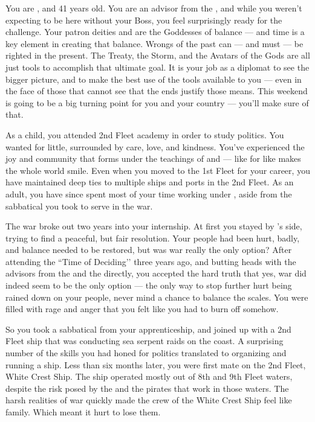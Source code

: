 \documentclass[char]{GL2020}
\begin{document}
\name{\cJuniorStatesman{}}

You are \cJuniorStatesman{\intro}, and 41 years old. You are an advisor from the \pShip{}, and while you weren't expecting to be here without your Boss, you feel surprisingly ready for the challenge. Your patron deities \cEbbFull{\intro} and \cFlowFull{\intro} are the Goddesses of balance — and time is a key element in creating that balance. Wrongs of the past can — and must — be righted in the present. The Treaty, the Storm, and the Avatars of the Gods are all just tools to accomplish that ultimate goal. It is your job as a diplomat to see the bigger picture, and to make the best use of the tools available to you — even in the face of those that cannot see that the ends justify those means. This weekend is going to be a big turning point for you and your country — you'll make sure of that.

As a child, you attended 2nd Fleet academy in order to study politics. You wanted for little, surrounded by care, love, and kindness. You’ve experienced the joy and community that forms under the teachings of \cEbb{\intro} and \cFlow{\intro} — like for like makes the whole world smile. Even when you moved to the 1st Fleet for your career, you have maintained deep ties to multiple ships and ports in the 2nd Fleet. As an adult, you have since spent most of your time working under \cHeadDiplomat{\intro}, aside from the sabbatical you took to serve in the war. 

The war broke out two years into your internship. At first you stayed by \cHeadDiplomat{}’s side, trying to find a peaceful, but fair resolution. Your people had been hurt, badly, and balance needed to be restored, but was war really the only option? After attending the ``Time of Deciding’’ three years ago, and butting heads with the advisors from the \pFarm{} and the \pTech{} directly, you accepted the hard truth that yes, war did indeed seem to be the only option — the only way to stop further hurt being rained down on your people, never mind a chance to balance the scales. You were filled with rage and anger that you felt like you had to burn off somehow.

So you took a sabbatical from your apprenticeship, and joined up with a 2nd Fleet ship that was conducting sea serpent raids on the \pFarm{} coast. A surprising number of the skills you had honed for politics translated to organizing and running a ship. Less than six months later, you were first mate on the 2nd Fleet, White Crest Ship. The ship operated mostly out of 8th and 9th Fleet waters, despite the risk posed by the \pWod{} and the pirates that work in those waters. The harsh realities of war quickly made the crew of the White Crest Ship feel like family. Which meant it hurt to lose them. 
\end{document}
